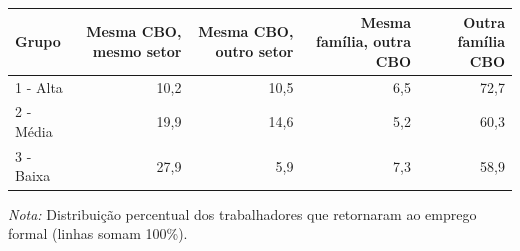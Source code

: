 \providecommand{\toprule}{\hline\hline}
\providecommand{\midrule}{\hline}
\providecommand{\bottomrule}{\hline\hline}
\providecommand{\addlinespace}[1][]{}
{\small
\renewcommand{\arraystretch}{1.12}
\begin{tabular}{lrrrr}
\toprule
Grupo & Mesma CBO, mesmo setor & Mesma CBO, outro setor & Mesma família, outra CBO & Outra família CBO \\
\midrule
1 - Alta & 10,2 & 10,5 & 6,5 & 72,7 \\
2 - Média & 19,9 & 14,6 & 5,2 & 60,3 \\
3 - Baixa & 27,9 & 5,9 & 7,3 & 58,9 \\
\bottomrule
\end{tabular}
\vspace{2pt}
\par{\footnotesize \textit{Nota:} Distribuição percentual dos trabalhadores que retornaram ao emprego formal (linhas somam 100\%).}
}
